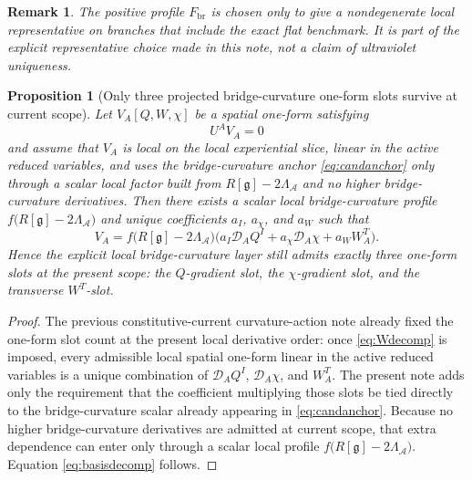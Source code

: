 \documentclass[11pt]{article}
\newcommand{\Sub}{\mathcal{A}}
\newcommand{\BridgeMetric}{\mathfrak g}
\newcommand{\SpatialD}{\mathcal D}
\newcommand{\CurvProfile}{F_{\mathrm{br}}}
\newtheorem{proposition}{Proposition}
\newtheorem{remark}{Remark}
\begin{document}
\begin{remark}
The positive profile \(\CurvProfile\) is chosen only to give a nondegenerate local representative on branches that include the exact flat benchmark. It is part of the explicit representative choice made in this note, not a claim of ultraviolet uniqueness.
\end{remark}

\begin{proposition}[Only three projected bridge-curvature one-form slots survive at current scope]
\label{prop:basis}
Let \(V_A[Q,W,\chi]\) be a spatial one-form satisfying
\begin{equation}
U^AV_A=0
\label{eq:spatialV}
\end{equation}
and assume that \(V_A\) is local on the local experiential slice, linear in the active reduced variables, and uses the bridge-curvature anchor \eqref{eq:candanchor} only through a scalar local factor built from \(R[\BridgeMetric]-2\Lambda_{\Sub}\) and no higher bridge-curvature derivatives. Then there exists a scalar local bridge-curvature profile \(f\bigl(R[\BridgeMetric]-2\Lambda_{\Sub}\bigr)\) and unique coefficients \(a_I\), \(a_\chi\), and \(a_W\) such that
\begin{equation}
V_A
=
f\bigl(R[\BridgeMetric]-2\Lambda_{\Sub}\bigr)
\bigl(
a_I\SpatialD_AQ^I
+a_\chi\SpatialD_A\chi
+a_WW_A^T
\bigr).
\label{eq:basisdecomp}
\end{equation}
Hence the explicit local bridge-curvature layer still admits exactly three one-form slots at the present scope: the \(Q\)-gradient slot, the \(\chi\)-gradient slot, and the transverse \(W^T\)-slot.
\end{proposition}

\begin{proof}
The previous constitutive-current curvature-action note already fixed the one-form slot count at the present local derivative order: once \eqref{eq:Wdecomp} is imposed, every admissible local spatial one-form linear in the active reduced variables is a unique combination of \(\SpatialD_AQ^I\), \(\SpatialD_A\chi\), and \(W_A^T\). The present note adds only the requirement that the coefficient multiplying those slots be tied directly to the bridge-curvature scalar already appearing in \eqref{eq:candanchor}. Because no higher bridge-curvature derivatives are admitted at current scope, that extra dependence can enter only through a scalar local profile \(f\bigl(R[\BridgeMetric]-2\Lambda_{\Sub}\bigr)\). Equation \eqref{eq:basisdecomp} follows.
\end{proof}
\end{document}
